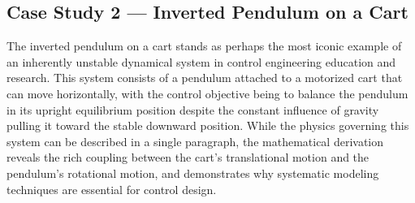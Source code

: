 \subsection{Case Study 2 — Inverted Pendulum on a Cart}

The inverted pendulum on a cart stands as perhaps the most iconic example of an inherently unstable dynamical system in control engineering education and research. This system consists of a pendulum attached to a motorized cart that can move horizontally, with the control objective being to balance the pendulum in its upright equilibrium position despite the constant influence of gravity pulling it toward the stable downward position. While the physics governing this system can be described in a single paragraph, the mathematical derivation reveals the rich coupling between the cart's translational motion and the pendulum's rotational motion, and demonstrates why systematic modeling techniques are essential for control design.

